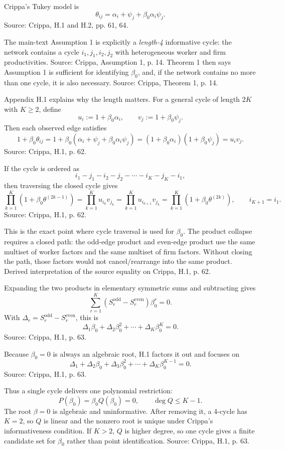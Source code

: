 \documentclass[11pt]{article}
\begin{document}
Crippa's Tukey model is
\[
\theta_{ij}=\alpha_i+\psi_j+\beta_0\alpha_i\psi_j .
\]
Source: Crippa, H.1 and H.2, pp. 61, 64.

The main-text Assumption 1 is explicitly a \emph{length-4} informative cycle:
the network contains a cycle $i_1,j_1,i_2,j_2$ with heterogeneous worker and firm
productivities. Source: Crippa, Assumption 1, p. 14. Theorem 1 then says
Assumption 1 is sufficient for identifying $\beta_0$, and, if the network contains
no more than one cycle, it is also necessary. Source: Crippa, Theorem 1, p. 14.

Appendix H.1 explains why the length matters. For a general cycle of length
$2K$ with $K\geq2$, define
\[
u_i:=1+\beta_0\alpha_i,
\qquad
v_j:=1+\beta_0\psi_j.
\]
Then each observed edge satisfies
\[
1+\beta_0\theta_{ij}
=1+\beta_0(\alpha_i+\psi_j+\beta_0\alpha_i\psi_j)
=(1+\beta_0\alpha_i)(1+\beta_0\psi_j)
=u_iv_j.
\]
Source: Crippa, H.1, p. 62.

If the cycle is ordered as
\[
i_1-j_1-i_2-j_2-\cdots-i_K-j_K-i_1,
\]
then traversing the closed cycle gives
\[
\prod_{k=1}^{K}\left(1+\beta_0\theta^{(2k-1)}\right)
=
\prod_{k=1}^{K}u_{i_k}v_{j_k}
=
\prod_{k=1}^{K}u_{i_{k+1}}v_{j_k}
=
\prod_{k=1}^{K}\left(1+\beta_0\theta^{(2k)}\right),
\qquad i_{K+1}=i_1.
\]
Source: Crippa, H.1, p. 62.

This is the exact point where cycle traversal is used for $\beta_0$. The product
collapse requires a closed path: the odd-edge product and even-edge product use
the same multiset of worker factors and the same multiset of firm factors. Without
closing the path, those factors would not cancel/rearrange into the same product.
Derived interpretation of the source equality on Crippa, H.1, p. 62.

Expanding the two products in elementary symmetric sums and subtracting gives
\[
\sum_{r=1}^{K}\left(S_r^{\mathrm{odd}}-S_r^{\mathrm{even}}\right)\beta_0^r=0.
\]
With $\Delta_r=S_r^{\mathrm{odd}}-S_r^{\mathrm{even}}$, this is
\[
\Delta_1\beta_0+\Delta_2\beta_0^2+\cdots+\Delta_K\beta_0^K=0.
\]
Source: Crippa, H.1, p. 63.

Because $\beta_0=0$ is always an algebraic root, H.1 factors it out and focuses
on
\[
\Delta_1+\Delta_2\beta_0+\Delta_3\beta_0^2+\cdots+\Delta_K\beta_0^{K-1}=0.
\]
Source: Crippa, H.1, p. 63.

Thus a single cycle delivers one polynomial restriction:
\[
P(\beta_0)=\beta_0 Q(\beta_0)=0,\qquad \deg Q\le K-1.
\]
The root $\beta=0$ is algebraic and uninformative. After removing it, a 4-cycle
has $K=2$, so $Q$ is linear and the nonzero root is unique under Crippa's
informativeness condition. If $K>2$, $Q$ is higher degree, so one cycle gives a
finite candidate set for $\beta_0$ rather than point identification. Source:
Crippa, H.1, p. 63.
\end{document}
